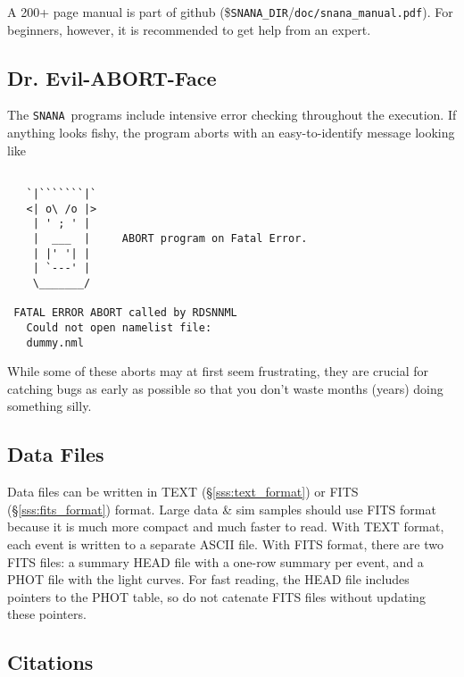 \documentclass[12pt]{article}
\newcommand{\snana}{{\tt SNANA}}
\newcommand{\snanadir}{{\tt SNANA\_DIR}}
\begin{document}
{A 200+ page manual is part of github 
(\$\snanadir/{\tt doc/snana\_manual.pdf}).
For beginners, however, it is recommended to get help
from an expert.

\subsection{Dr. Evil-ABORT-Face}
\label{abort}

The \snana\ programs include intensive error checking throughout 
the execution. If anything looks fishy, 
the program aborts with an easy-to-identify message looking like
%
\begin{Verbatim}[frame=single]

   `|```````|`    
   <| o\ /o |>    
    | ' ; ' |     
    |  ___  |     ABORT program on Fatal Error. 
    | |' '| |     
    | `---' |     
    \_______/ 

 FATAL ERROR ABORT called by RDSNNML
   Could not open namelist file:
   dummy.nml   
\end{Verbatim}
%
While some of these aborts may at first seem frustrating,
they are crucial for catching bugs as early as possible
so that you don't waste months (years) doing something silly.


\subsection{Data Files}
\label{dataFiles}

Data files can be written in 
TEXT (\S\ref{sss:text_format}) or 
FITS (\S\ref{sss:fits_format}) 
format.
Large data \& sim samples should use FITS format because
it is much more compact and much faster to read.
With TEXT format, each event is written to a separate ASCII file.
With FITS format, there are two FITS files: a summary HEAD file
with a one-row summary per event, and a PHOT file with the
light curves. For fast reading, the HEAD file includes pointers
to the PHOT table, so do not catenate FITS files without updating
these pointers.

\subsection{Citations}
\label{subsec:cite}

}
\end{document}
